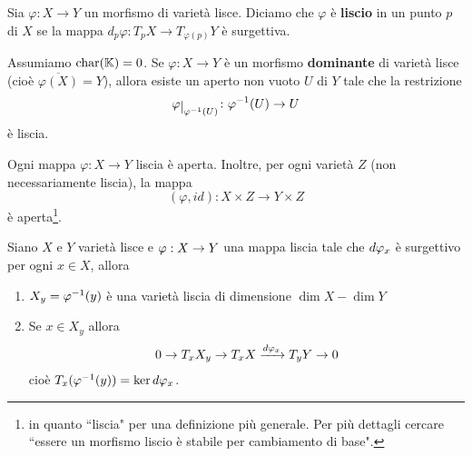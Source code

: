 \begin{definition}
    Sia $\varphi\colon X\to Y$ un morfismo di varietà lisce. Diciamo che $\varphi$ è \textbf{liscio} in un punto $p$ di $X$ se la mappa $d_p\varphi\colon T_pX\to T_{\varphi(p)}Y$ è surgettiva.
\end{definition}

\begin{theorem}\label{ThMorfismoDominanteTraLisceHaRestrizioneLisciaSuAperto}
    Assumiamo $\operatorname{char}(\mathbb{K})=0$. Se $\varphi\colon X\to Y$ è un morfismo \textbf{dominante} di varietà lisce (cioè $\overline{\varphi(X)}=Y$), allora esiste un aperto non vuoto $U$ di $Y$ tale che la restrizione \[\varphi\res{\varphi^{-1}(U)}\colon \varphi^{-1}(U) \to U\] è liscia.
\end{theorem}

\begin{theorem}\label{ThMappaLisciaEAperta}
    Ogni mappa $\varphi\colon X \to Y$ liscia è aperta. Inoltre, per ogni varietà $Z$ (non necessariamente liscia), la mappa \[(\varphi,id)\colon X\times Z \to Y\times Z\] è aperta\footnote{in quanto ``liscia" per una definizione pi\`u generale. Per pi\`u dettagli cercare ``essere un morfismo liscio \`e stabile per cambiamento di base".}.
\end{theorem}


\begin{theorem}\label{ThFibrePerMappeLiscie}
Siano $X$ e $Y$ variet\`a lisce e $\varphi:X\to Y$ una mappa liscia tale che $d\varphi_x$ \`e surgettivo per ogni $x\in X$, allora
\begin{enumerate}
	\item $X_y=\varphi^{-1}(y)$ \`e una variet\`a liscia di dimensione $\dim X-\dim Y$
	\item Se $x\in X_y$ allora
	\[0\to T_x X_y\to T_x X\xrightarrow{d\varphi_x} T_y Y\to 0\]
    cio\`e $T_x (\varphi^{-1}(y))=\ker d\varphi_x$.
\end{enumerate}
\end{theorem}
